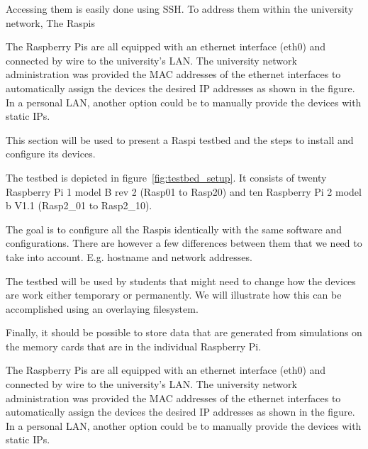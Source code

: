 Accessing them is easily done using \ac{SSH}.
To address them within the university network, 
The \ac{Raspi}s

The Raspberry Pis are all equipped with an ethernet interface (eth0) and
connected by wire to the university's \ac{LAN}. The university network
administration was provided
the \ac{MAC} addresses of the ethernet interfaces to automatically assign
the devices the desired \ac{IP} addresses as shown in the figure. In a personal
\ac{LAN}, another option could be to manually provide the devices with static
\ac{IP}s.


This section will be used to present a \ac{Raspi} testbed and the steps to
install and configure its devices.

The testbed is depicted in figure~\ref{fig:testbed_setup}. It consists of twenty
Raspberry Pi 1 model B rev 2 (Rasp01 to Rasp20) and 
ten Raspberry Pi 2 model b V1.1 (Rasp2\_01 to Rasp2\_10).

The goal is to configure all the \ac{Raspi}s identically with the same software
and configurations. There are however a few differences between them that we
need to take into account. E.g. hostname and network addresses.

The testbed will be used by students that might need to change how the
devices are work either temporary or permanently. We will illustrate how this
can be accomplished using an overlaying filesystem.

Finally, it should be possible to store data that are generated from
simulations on the memory cards that are in the individual Raspberry Pi.



The Raspberry Pis are all equipped with an ethernet interface (eth0) and
connected by wire to the university's \ac{LAN}. The university network
administration was provided
the \ac{MAC} addresses of the ethernet interfaces to automatically assign
the devices the desired \ac{IP} addresses as shown in the figure. In a personal
\ac{LAN}, another option could be to manually provide the devices with static
\ac{IP}s.

